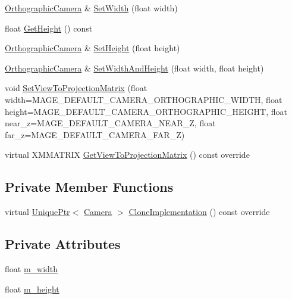 \begin{DoxyCompactItemize}
\hyperlink{classmage_1_1_orthographic_camera}{Orthographic\+Camera} \& \hyperlink{classmage_1_1_orthographic_camera_aa38c67d3cfb41fb715bdf71d417bbc0d}{Set\+Width} (float width)
\item 
float \hyperlink{classmage_1_1_orthographic_camera_a596e2cf22fee8cf30139ffe9d4cdcda7}{Get\+Height} () const
\item 
\hyperlink{classmage_1_1_orthographic_camera}{Orthographic\+Camera} \& \hyperlink{classmage_1_1_orthographic_camera_a57cb23f7bee15791f6a73a1244815614}{Set\+Height} (float height)
\item 
\hyperlink{classmage_1_1_orthographic_camera}{Orthographic\+Camera} \& \hyperlink{classmage_1_1_orthographic_camera_a3ba89b58268c56fbebb8904bbe260f2f}{Set\+Width\+And\+Height} (float width, float height)
\item 
void \hyperlink{classmage_1_1_orthographic_camera_a10e09af47e741ab76dc2aa2a03f04c06}{Set\+View\+To\+Projection\+Matrix} (float width=M\+A\+G\+E\+\_\+\+D\+E\+F\+A\+U\+L\+T\+\_\+\+C\+A\+M\+E\+R\+A\+\_\+\+O\+R\+T\+H\+O\+G\+R\+A\+P\+H\+I\+C\+\_\+\+W\+I\+D\+TH, float height=M\+A\+G\+E\+\_\+\+D\+E\+F\+A\+U\+L\+T\+\_\+\+C\+A\+M\+E\+R\+A\+\_\+\+O\+R\+T\+H\+O\+G\+R\+A\+P\+H\+I\+C\+\_\+\+H\+E\+I\+G\+HT, float near\+\_\+z=M\+A\+G\+E\+\_\+\+D\+E\+F\+A\+U\+L\+T\+\_\+\+C\+A\+M\+E\+R\+A\+\_\+\+N\+E\+A\+R\+\_\+Z, float far\+\_\+z=M\+A\+G\+E\+\_\+\+D\+E\+F\+A\+U\+L\+T\+\_\+\+C\+A\+M\+E\+R\+A\+\_\+\+F\+A\+R\+\_\+Z)
\item 
virtual X\+M\+M\+A\+T\+R\+IX \hyperlink{classmage_1_1_orthographic_camera_aedd86e56a0f7bc967ad8d9be2631a0cf}{Get\+View\+To\+Projection\+Matrix} () const override
\end{DoxyCompactItemize}
\subsection*{Private Member Functions}
\begin{DoxyCompactItemize}
\item 
virtual \hyperlink{namespacemage_a8c307fbcc33bce9b7f2aa4c26c3b95cf}{Unique\+Ptr}$<$ \hyperlink{classmage_1_1_camera}{Camera} $>$ \hyperlink{classmage_1_1_orthographic_camera_aeef89cff8f4272b1412fa3ce366e656d}{Clone\+Implementation} () const override
\end{DoxyCompactItemize}
\subsection*{Private Attributes}
\begin{DoxyCompactItemize}
\item 
float \hyperlink{classmage_1_1_orthographic_camera_aadef4cff19cc1b1ecf427f82bbc3ea6a}{m\+\_\+width}
\item 
float \hyperlink{classmage_1_1_orthographic_camera_a63169098f604874c1b30c4b276b5a3e1}{m\+\_\+height}
\end{DoxyCompactItemize}
